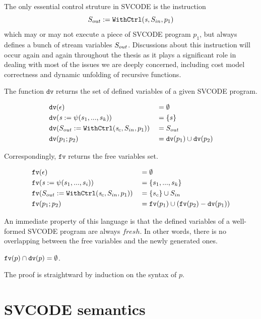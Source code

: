 The only essential control struture in SVCODE is the instruction 
$$S_{out} := \mathtt{WithCtrl}(\mathit{s},S_{in},p_1) $$
which may or may not execute a piece of SVCODE program $p_1$, but always defines a bunch of stream variables $S_{out}$. Discussions about this \wc 
instruction will occur again and again throughout the thesis as it plays a significant role in dealing with most of the issues we are deeply concerned, 
including cost model correctness and dynamic unfolding of recursive functions. 




The function $\texttt{dv}$ returns the set of defined variables of a given SVCODE program.

\begin{alignat*}{2}
&\mathtt{dv}(\epsilon) && =  \emptyset \\
&\mathtt{dv}(\mathit{s} := \psi(s_1,...,s_k)) && =  \{s\} \\
&\mathtt{dv}(S_{out} := \mathtt{WithCtrl}(\mathit{s}_c,S_{in},p_1)) && =   S_{out} \\
&\mathtt{dv}(p_1;p_2) && =  \mathtt{dv}(p_1) \cup \mathtt{dv}(p_2) \\
\end{alignat*}

Correspondingly, $\texttt{fv}$ returns the free variables set.

\begin{alignat*}{2}
&\mathtt{fv}(\epsilon) && = \emptyset \\
&\mathtt{fv}(\mathit{s} := \psi(s_1,...,s_i)) && = \{s_1,...,s_k\}\\
&\mathtt{fv}(S_{out} := \mathtt{WithCtrl}(\mathit{s}_c,S_{in},p_1)) && = \{s_c\} \cup S_{in} \\
&\mathtt{fv}(p_1;p_2) && = \mathtt{fv}(p_1) \cup (\mathtt{fv}(p_2) - \mathtt{dv}(p_1)) \\
\end{alignat*}


An immediate property of this language is that the defined variables of a well-formed SVCODE program are always $fresh$. In other words, there is no overlapping between the free variables and the newly generated ones.
\begin{lem}
	$\mathtt{fv}(p) \cap \mathtt{dv}(p) = \emptyset $. 
\end{lem}

The proof is straightward by induction on the syntax of $p$.



\section{SVCODE semantics}

